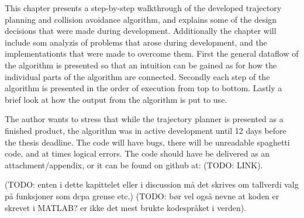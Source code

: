 


This chapter presents a step-by-step walkthrough of the developed trajectory planning and collision avoidance algorithm, and explains some of the
design decisions that were made during development. Additionally the chapter will include som analyzis of problems that arose during development,
and the implementationts that were made to overcome them. First the general dataflow of the algorithm is presented so that an intuition
can be gained as for how the individual parts of the algorithm are connected. Secondly each step of the algorithm is presented in the order of execution
from top to bottom. Lastly a brief look at how the output from the algorithm is put to use. 

The author wants to stress that while the trajectory planner is presented as a finished product, the algorithm was in active development until 12 days before
the thesis deadline. The code will have bugs, there will be unreadable spaghetti code, and at times logical errors. The code should have be delivered
as an attachment/appendix, or it can be found on github at: (TODO: LINK).

(TODO: enten i dette kapittelet eller i discussion må det skrives om tallverdi valg på funksjoner som dcpa grense etc.)
(TODO: bør vel også nevne at koden er skrevet i MATLAB? er ikke det mest brukte kodespråket i verden).

